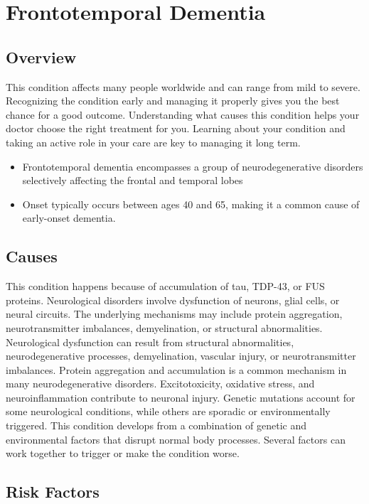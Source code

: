 \chapter{Frontotemporal Dementia}
\label{sec:Frontotemporal Dementia}

\section{Overview}
This condition affects many people worldwide and can range from mild to severe. Recognizing the condition early and managing it properly gives you the best chance for a good outcome. Understanding what causes this condition helps your doctor choose the right treatment for you. Learning about your condition and taking an active role in your care are key to managing it long term.

\begin{itemize}[noitemsep]
  \item Frontotemporal dementia encompasses a group of neurodegenerative disorders selectively affecting the frontal and temporal lobes
  \item Onset typically occurs between ages 40 and 65, making it a common cause of early-onset dementia.
\end{itemize}

\section{Causes}
This condition happens because of accumulation of tau, TDP-43, or FUS proteins. Neurological disorders involve dysfunction of neurons, glial cells, or neural circuits. The underlying mechanisms may include protein aggregation, neurotransmitter imbalances, demyelination, or structural abnormalities. Neurological dysfunction can result from structural abnormalities, neurodegenerative processes, demyelination, vascular injury, or neurotransmitter imbalances. Protein aggregation and accumulation is a common mechanism in many neurodegenerative disorders. Excitotoxicity, oxidative stress, and neuroinflammation contribute to neuronal injury. Genetic mutations account for some neurological conditions, while others are sporadic or environmentally triggered. This condition develops from a combination of genetic and environmental factors that disrupt normal body processes. Several factors can work together to trigger or make the condition worse.

\section{Risk Factors}


